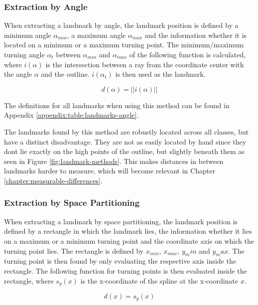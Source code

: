\documentclass[pdftex,12pt,a4paper]{report}
\begin{document}
\subsubsection{Extraction by Angle}

When extracting a landmark by angle, the landmark position is defined by a minimum angle $\alpha_{min}$, a maximum
angle $\alpha_{max}$ and the information whether it is located on a minimum or a maximum turning point.
The minimum/maximum turning angle $\alpha_{t}$ between $\alpha_{min}$ and $\alpha_{max}$ of the following function
is calculated, where $i(\alpha)$ is the intersection between a ray from the coordinate center with the angle $\alpha$ and
the outline. $i(\alpha_t)$ is then used as the landmark.

\begin{equation}
d(\alpha) = ||i(\alpha)||
\end{equation}

The definitions for all landmarks when using this method can be found in Appendix \ref{appendix:table:landmarks-angle}.

The landmarks found by this method are robustly located across all classes, but have a distinct disadvantage. They are
not as easily located by hand since they dont lie exactly on the high points of the outline, but slightly beneath
them  as seen in Figure \ref{fig:landmark-methods}. This makes distances in between landmarks harder to measure, which
will become relevant in Chapter \ref{chapter:measurable-differences}.

\subsubsection{Extraction by Space Partitioning}

When extracting a landmark by space partitioning, the landmark position is defined by a rectangle in which the landmark
lies, the information whether it lies on a maximum or a minimum turning point and the coordinate axis on which the
turning point lies. The rectangle is defined by $x_{min}$, $x_{max}$, $y_min$ and $y_max$. The turning point
is then found by only evaluating the respective axis inside the rectangle. The following function for turning points
is then evaluated inside the rectangle, where $s_y(x)$ is the x-coordinate of the spline at the x-coordinate $x$.

\begin{equation}
d(x) = s_y(x)
\end{equation}
\end{document}
